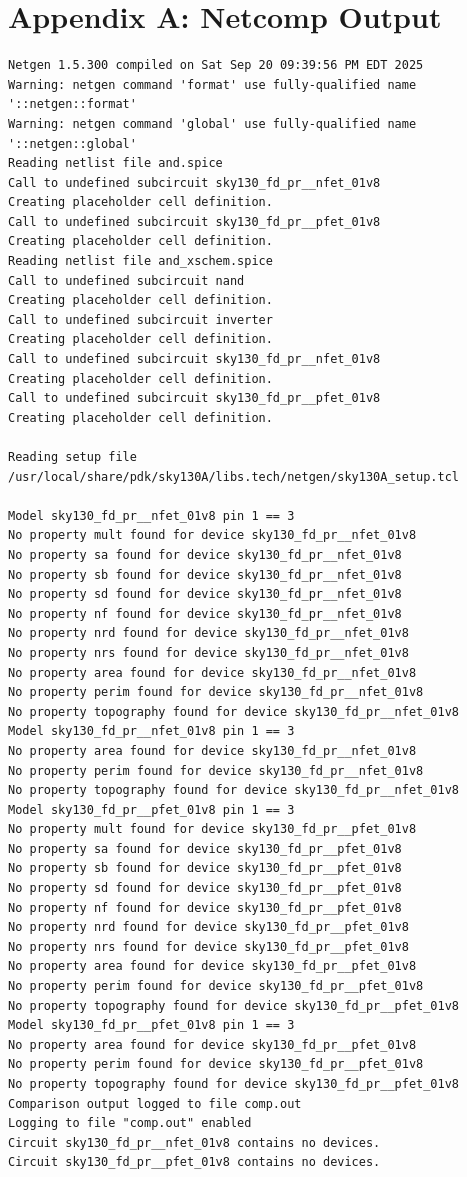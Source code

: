 \documentclass[11pt]{article}
\begin{document}
\section*{Appendix A: Netcomp Output}
\begin{lstlisting}
Netgen 1.5.300 compiled on Sat Sep 20 09:39:56 PM EDT 2025
Warning: netgen command 'format' use fully-qualified name '::netgen::format'
Warning: netgen command 'global' use fully-qualified name '::netgen::global'
Reading netlist file and.spice
Call to undefined subcircuit sky130_fd_pr__nfet_01v8
Creating placeholder cell definition.
Call to undefined subcircuit sky130_fd_pr__pfet_01v8
Creating placeholder cell definition.
Reading netlist file and_xschem.spice
Call to undefined subcircuit nand
Creating placeholder cell definition.
Call to undefined subcircuit inverter
Creating placeholder cell definition.
Call to undefined subcircuit sky130_fd_pr__nfet_01v8
Creating placeholder cell definition.
Call to undefined subcircuit sky130_fd_pr__pfet_01v8
Creating placeholder cell definition.

Reading setup file /usr/local/share/pdk/sky130A/libs.tech/netgen/sky130A_setup.tcl

Model sky130_fd_pr__nfet_01v8 pin 1 == 3
No property mult found for device sky130_fd_pr__nfet_01v8
No property sa found for device sky130_fd_pr__nfet_01v8
No property sb found for device sky130_fd_pr__nfet_01v8
No property sd found for device sky130_fd_pr__nfet_01v8
No property nf found for device sky130_fd_pr__nfet_01v8
No property nrd found for device sky130_fd_pr__nfet_01v8
No property nrs found for device sky130_fd_pr__nfet_01v8
No property area found for device sky130_fd_pr__nfet_01v8
No property perim found for device sky130_fd_pr__nfet_01v8
No property topography found for device sky130_fd_pr__nfet_01v8
Model sky130_fd_pr__nfet_01v8 pin 1 == 3
No property area found for device sky130_fd_pr__nfet_01v8
No property perim found for device sky130_fd_pr__nfet_01v8
No property topography found for device sky130_fd_pr__nfet_01v8
Model sky130_fd_pr__pfet_01v8 pin 1 == 3
No property mult found for device sky130_fd_pr__pfet_01v8
No property sa found for device sky130_fd_pr__pfet_01v8
No property sb found for device sky130_fd_pr__pfet_01v8
No property sd found for device sky130_fd_pr__pfet_01v8
No property nf found for device sky130_fd_pr__pfet_01v8
No property nrd found for device sky130_fd_pr__pfet_01v8
No property nrs found for device sky130_fd_pr__pfet_01v8
No property area found for device sky130_fd_pr__pfet_01v8
No property perim found for device sky130_fd_pr__pfet_01v8
No property topography found for device sky130_fd_pr__pfet_01v8
Model sky130_fd_pr__pfet_01v8 pin 1 == 3
No property area found for device sky130_fd_pr__pfet_01v8
No property perim found for device sky130_fd_pr__pfet_01v8
No property topography found for device sky130_fd_pr__pfet_01v8
Comparison output logged to file comp.out
Logging to file "comp.out" enabled
Circuit sky130_fd_pr__nfet_01v8 contains no devices.
Circuit sky130_fd_pr__pfet_01v8 contains no devices.


\end{lstlisting}
\end{document}
